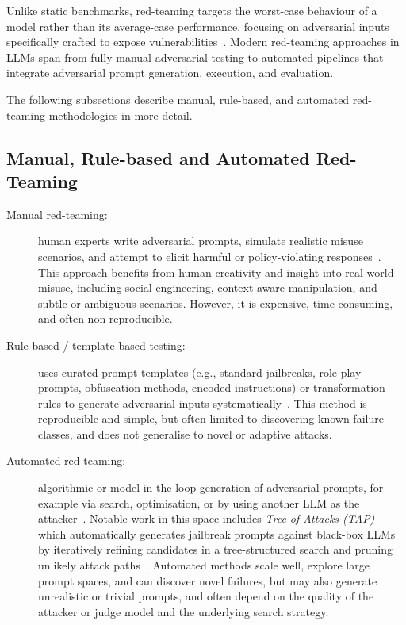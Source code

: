 Unlike static benchmarks, red-teaming targets the worst-case behaviour of a model rather than its average-case performance, focusing on adversarial inputs specifically crafted to expose vulnerabilities~\cite{mazeika2024harmbench, schoepf2025madmax}.
Modern red-teaming approaches in LLMs span from fully manual adversarial testing to automated pipelines that integrate adversarial prompt generation, execution, and evaluation.

The following subsections describe manual, rule-based, and automated red-teaming methodologies in more detail.

\subsection{Manual, Rule-based and Automated Red-Teaming}\label{subsec:red-teaming-methods}

\begin{description}
  \item[Manual red-teaming:] human experts write adversarial prompts, simulate realistic misuse scenarios, and attempt to elicit harmful or policy-violating responses~\cite{purpura2025building}.
  This approach benefits from human creativity and insight into real-world misuse, including social-engineering, context-aware manipulation, and subtle or ambiguous scenarios.
  However, it is expensive, time-consuming, and often non-reproducible.

  \item[Rule-based / template-based testing:] uses curated prompt templates (e.g., standard jailbreaks, role-play prompts, obfuscation methods, encoded instructions) or transformation rules to generate adversarial inputs systematically~\cite{schoepf2025madmax, mazeika2024harmbench}.
  This method is reproducible and simple, but often limited to discovering known failure classes, and does not generalise to novel or adaptive attacks.

  \item[Automated red-teaming:] algorithmic or model-in-the-loop generation of adversarial prompts, for example via search, optimisation, or by using another LLM as the attacker~\cite{schoepf2025madmax, belaire2025automatic}.
  Notable work in this space includes {\em Tree of Attacks (TAP)} which automatically generates jailbreak prompts against black-box LLMs by iteratively refining candidates in a tree-structured search and pruning unlikely attack paths~\cite{mehrotra2024tap}.
  Automated methods scale well, explore large prompt spaces, and can discover novel failures, but may also generate unrealistic or trivial prompts, and often depend on the quality of the attacker or judge model and the underlying search strategy.
\end{description}

